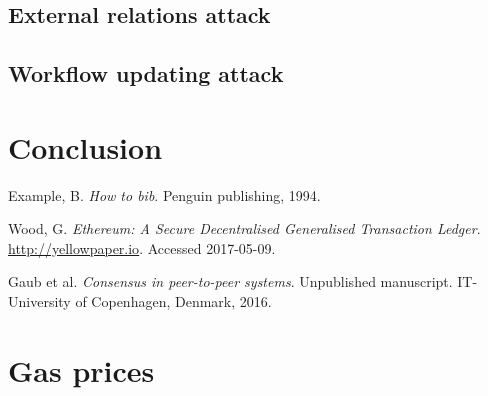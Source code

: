 \documentclass{article}
\begin{document}
		\subsection{External relations attack}

		\subsection{Workflow updating attack}

	\section{Conclusion}

	\pagebreak
	\begin{thebibliography}{99}

		Example, B.
		\textit{How to bib}.
		Penguin publishing,
		1994.

		Wood, G.
		\textit{Ethereum: A Secure Decentralised Generalised Transaction Ledger}. 
		\url{http://yellowpaper.io}.
		Accessed 2017-05-09.

		Gaub et al.
		\textit{Consensus in peer-to-peer systems}.
		Unpublished manuscript.
		IT-University of Copenhagen,
		Denmark,
		2016.


	\end{thebibliography}

	\appendix

	\section{Gas prices}
\end{document}
